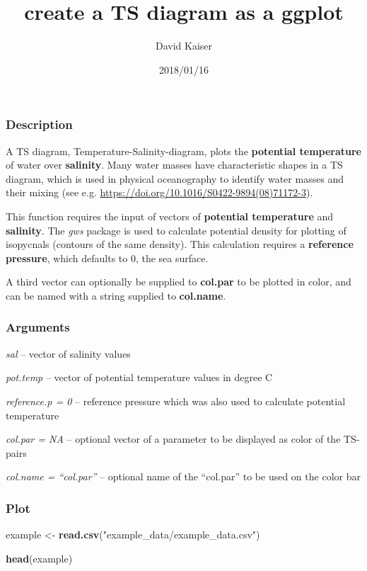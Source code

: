\documentclass[]{article}
\title{create a TS diagram as a ggplot}
\author{David Kaiser}
\date{2018/01/16}
\newenvironment{Shaded}{\begin{snugshade}}{\end{snugshade}}
\newcommand{\KeywordTok}[1]{\textcolor[rgb]{0.13,0.29,0.53}{\textbf{#1}}}
\newcommand{\StringTok}[1]{\textcolor[rgb]{0.31,0.60,0.02}{#1}}
\newcommand{\NormalTok}[1]{#1}
\begin{document}
\maketitle

\subsubsection{Description}\label{description}

A TS diagram, Temperature-Salinity-diagram, plots the \textbf{potential
temperature} of water over \textbf{salinity}. Many water masses have
characteristic shapes in a TS diagram, which is used in physical
oceanography to identify water masses and their mixing (see e.g.
\url{https://doi.org/10.1016/S0422-9894(08)71172-3}).

This function requires the input of vectors of \textbf{potential
temperature} and \textbf{salinity}. The \emph{gws} package is used to
calculate potential density for plotting of isopycnals (contours of the
same density). This calculation requires a \textbf{reference pressure},
which defaults to 0, the sea surface.

A third vector can optionally be supplied to \textbf{col.par} to be
plotted in color, and can be named with a string supplied to
\textbf{col.name}.

\subsubsection{Arguments}\label{arguments}

\emph{sal} -- vector of salinity values

\emph{pot.temp} -- vector of potential temperature values in degree C

\emph{reference.p = 0} -- reference pressure which was also used to
calculate potential temperature

\emph{col.par = NA} -- optional vector of a parameter to be displayed as
color of the TS-pairs

\emph{col.name = ``col.par''} -- optional name of the ``col.par'' to be
used on the color bar

\subsubsection{Plot}\label{plot}

\begin{Shaded}
\begin{Highlighting}[]
\NormalTok{example <-}\StringTok{ }\KeywordTok{read.csv}\NormalTok{(}\StringTok{"example_data/example_data.csv"}\NormalTok{)}

\KeywordTok{head}\NormalTok{(example)}
\end{Highlighting}
\end{Shaded}
\end{document}
